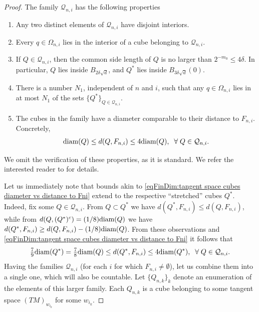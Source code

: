 \documentclass[11pt,reqno]{amsart}
\numberwithin{equation}{section}
\theoremstyle{plain}
\def\diam{\textnormal{diam}}
\begin{document}
\begin{proof}
    The family $\mathcal{Q}_{n,i}$ has the following properties
    \begin{enumerate}
      \item Any two distinct elements of $\mathcal{Q}_{n,i}$ have disjoint interiors.
      \item Every $q\in \Omega_{n,i}$ lies in the interior of a cube belonging to $\mathcal{Q}_{n,i}$.
      \item If $Q \in \mathcal{Q}_{n,i}$, then the common side length of $Q$ is no larger than $2^{-m_0}\leq 4\delta$. In particular, $Q$ lies inside $B_{2\delta \sqrt{d}}$, and $Q^*$ lies inside $B_{3\delta \sqrt{d}}(0)$.
      \item There is a number $N_1$, independent of $n$ and $i$, such that any $q \in \Omega_{n,i}$ lies in at most $N_1$ of the sets $\{Q^*\}_{Q\in \mathcal{Q}_{n,i}}$.
      \item The cubes in the family have a diameter comparable to their distance to $F_{n,i}$. Concretely, 
      \begin{align}
        \diam(Q) \leq d(Q,F_{n,i}) \leq 4\diam(Q), \;\;\forall\;Q\in\mathcal{Q}_{n,i}.\label{eqFinDim:tangent space cubes diameter vs distance to Fni}
      \end{align}		  	  	  	   
    \end{enumerate}	
    We omit the verification of these properties, as it is standard. We refer the interested reader to \cite[Chap. 6, Sec. 1]{Stei-71} for details. 
	
      Let us immediately note that bounds akin to \eqref{eqFinDim:tangent space cubes diameter vs distance to Fni} extend to the respective ``stretched'' cubes $Q^*$. Indeed, fix some $Q \in \mathcal{Q}_{n,i}$. From $Q\subset Q^*$ we have $d(Q^*,F_{n,i}) \leq d(Q,F_{n,i})$, while from $d(Q,(Q^*)^c) = (1/8)\diam(Q)$ we have $d(Q^*,F_{n,i})\geq d(Q,F_{n,i})-(1/8)\diam(Q)$. From these observations and \eqref{eqFinDim:tangent space cubes diameter vs distance to Fni} it follows that
      \begin{align}
        \tfrac{7}{9}\diam(Q^*)= \tfrac{7}{8}\diam(Q)\leq d(Q^*,F_{n,i}) \leq 4\diam(Q^*), \;\;\forall\;Q\in\mathcal{Q}_{n,i}.\label{eqFinDim:tangent space larger cubes diameter vs distance to Fni}						
      \end{align}		  	  	  	   
    Having the families $\mathcal{Q}_{n,i}$ (for each $i$ for which $F_{n,i}\not=\emptyset$), let us combine them into a single one, which will also be countable. Let $\{Q_{n,k}\}_k$ denote an enumeration of the elements of this larger family. Each $Q_{n,k}$ is a cube belonging to some tangent space $(TM)_{w_{i_k}}$ for some $w_{i_k}$. 
		

\end{proof}
\end{document}
